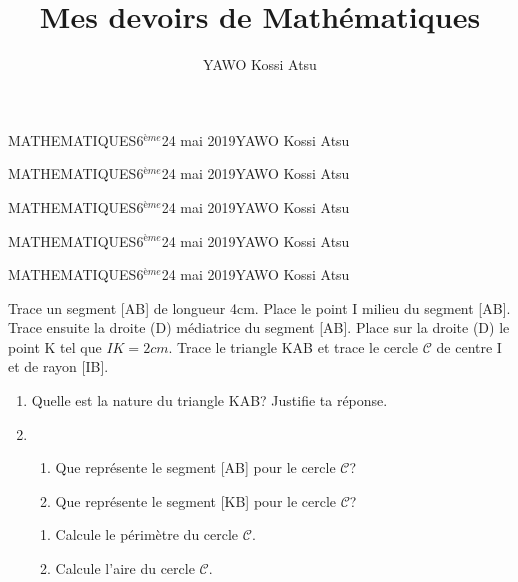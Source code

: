 \documentclass[12pt,a4paper]{book}
\author{YAWO Kossi Atsu}
\title{Mes devoirs de Mathématiques}
\newcommand{\prof}{YAWO Kossi Atsu}
\newcommand{\matiere}{MATHEMATIQUES}
\newcommand{\classe}{6$^{ème}$}
\begin{document}
\begin{td}{\matiere}{\classe}{24 mai 2019}{\prof}
\end{td}

\begin{td}{\matiere}{\classe}{24 mai 2019}{\prof}

\end{td}

\begin{td}{\matiere}{\classe}{24 mai 2019}{\prof}

\end{td}

\begin{td}{\matiere}{\classe}{24 mai 2019}{\prof}

\end{td}

\newpage
\begin{td}{\matiere}{\classe}{24 mai 2019}{\prof}
\begin{exo}
Trace un segment [AB] de longueur 4cm. Place le point I milieu du segment [AB]. Trace ensuite la droite (D) médiatrice du segment [AB]. Place sur la droite (D) le point K tel que $IK=2cm$. Trace le triangle KAB et trace le cercle $\mathcal{C}$ de centre I et de rayon [IB].
\begin{enumerate}
\item Quelle est la nature du triangle KAB? Justifie ta réponse.
\item \begin{enumerate}
\item Que représente le segment [AB] pour le cercle $\mathcal{C}$?
\item Que représente le segment [KB] pour le cercle $\mathcal{C}$?
\end{enumerate}
\begin{enumerate}
\item Calcule le périmètre du cercle $\mathcal{C}$.
\item Calcule l'aire du cercle $\mathcal{C}$.
\end{enumerate}
\end{enumerate}
\vspace{1cm}
\end{exo}


\end{td}
\end{document}

